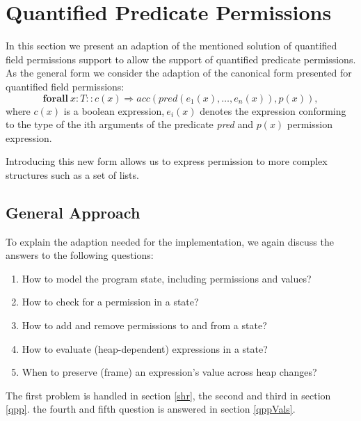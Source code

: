 \documentclass[12pt]{article}
\begin{document}
\section{Quantified Predicate Permissions}
\label{qp}
In this section we present an adaption of the mentioned solution of quantified field permissions support to allow the support of quantified predicate permissions. 
As the general form we consider the adaption of the canonical form presented for quantified field permissions: 
\begin{equation}
 \mathbf{forall} \   x:T :: c(x) \Rightarrow acc(pred(e_1 (x),…,e_n (x)), p(x)), 
\end{equation}
where \(c(x)\) is a boolean expression,\(\ e_i(x)\) denotes the expression conforming to the type of the ith arguments of the predicate \textit{pred} and \(p(x)\) permission expression.

Introducing this new form allows us to express permission to more complex structures such as a set of lists.

\subsection{General Approach}
To explain the adaption needed for the implementation, we again discuss the answers to the following questions:
\begin{enumerate}
\item How to model the program state, including permissions and values?
\item How to check for a permission in a state?
\item How to add and remove permissions to and from a state?
\item How to evaluate (heap-dependent) expressions in a state?
\item When to preserve (frame) an expression's value across heap changes?
\end{enumerate}

The first problem is handled in section \ref{shr}, the second and third in section \ref{qpp}. the fourth and fifth question is answered  in section \ref{qppVals}. 
\end{document}
